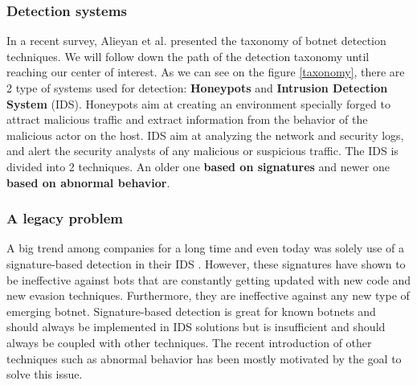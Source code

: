 \subsubsection{Detection systems} In a recent survey, Alieyan et al. \cite{survey1} presented the taxonomy of botnet detection techniques. We will follow down the path of the detection taxonomy until reaching our center of interest. As we can see on the figure \ref{taxonomy}, there are 2 type of systems used for detection: \textbf{Honeypots} and \textbf{Intrusion Detection System} (IDS). Honeypots aim at creating an environment specially forged to attract malicious traffic and extract information from the behavior of the malicious actor on the host. IDS aim at analyzing the network and security logs, and alert the security analysts of any malicious or suspicious traffic. The IDS is divided into 2 techniques. An older one \textbf{based on signatures} and newer one \textbf{based on abnormal behavior}.

\subsubsection{A legacy problem} A big trend among companies for a long time and even today was solely use of a signature-based detection in their IDS \cite{detection8}. However, these signatures have shown to be ineffective against bots that are constantly getting updated with new code and new evasion techniques. Furthermore, they are ineffective against any new type of emerging botnet. Signature-based detection is great for known botnets\cite{snort} and should always be implemented in IDS solutions but is insufficient and should always be coupled with other techniques. The recent introduction of other techniques such as abnormal behavior has been mostly motivated by the goal to solve this issue.

